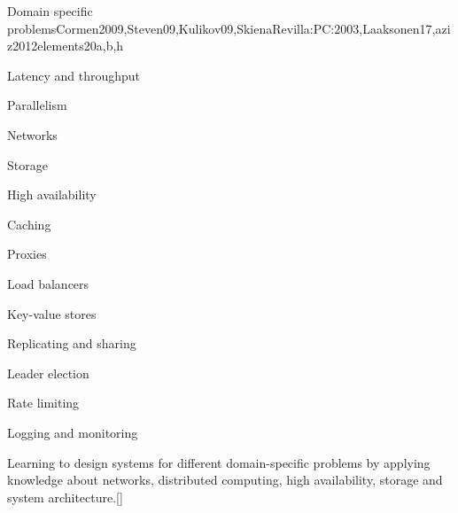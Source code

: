 \begin{syllabus}
  \begin{unit}{Domain specific problems}{}{Cormen2009,Steven09,Kulikov09,SkienaRevilla:PC:2003,Laaksonen17,aziz2012elements}{20}{a,b,h}
    \begin{topics}
      \item Latency and throughput
      \item Parallelism
      \item Networks
      \item Storage
      \item High availability
      \item Caching
      \item Proxies
      \item Load balancers
      \item Key-value stores
      \item Replicating and sharing
      \item Leader election
      \item Rate limiting
      \item Logging and monitoring
    \end{topics}
    \begin{learningoutcomes}
        \item Learning to design systems for different domain-specific problems by applying knowledge about networks, distributed computing, high availability, storage and system architecture.[\Usage]
    \end{learningoutcomes}
  \end{unit}
  
  \begin{coursebibliography}
  \end{coursebibliography}
  
  \end{syllabus}
  